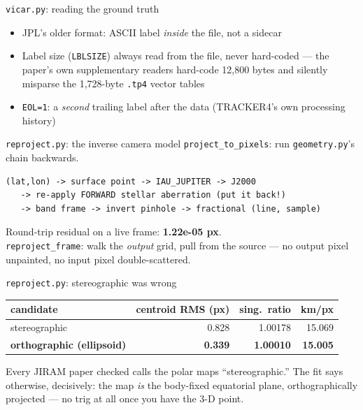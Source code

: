 \documentclass[aspectratio=169,11pt]{beamer}
\newcommand{\currevsec}{}
\newcommand{\revsec}[1]{\gdef\currevsec{#1}}
\begin{document}
\begin{frame}{\texttt{vicar.py}: reading the ground truth}
  \revsec{4.7}
  \begin{itemize}
    \item JPL's older format: ASCII label \emph{inside} the file, not a sidecar
    \item Label size (\texttt{LBLSIZE}) always read from the file, never hard-coded --- the paper's own supplementary readers hard-code 12{,}800 bytes and silently misparse the 1{,}728-byte \texttt{.tp4} vector tables
    \item \texttt{EOL=1}: a \emph{second} trailing label after the data (TRACKER4's own processing history)
  \end{itemize}
\end{frame}

\begin{frame}[fragile]{\texttt{reproject.py}: the inverse camera model}
  \revsec{4.8}
  \texttt{project\_to\_pixels}: run \texttt{geometry.py}'s chain backwards.
\begin{lstlisting}[basicstyle=\ttfamily\tiny,frame=none]
(lat,lon) -> surface point -> IAU_JUPITER -> J2000
   -> re-apply FORWARD stellar aberration (put it back!)
   -> band frame -> invert pinhole -> fractional (line, sample)
\end{lstlisting}
  Round-trip residual on a live frame: \textbf{1.22e-05 px}. \\
  \texttt{reproject\_frame}: walk the \emph{output} grid, pull from the source --- no output pixel unpainted, no input pixel double-scattered.
\end{frame}

\begin{frame}{\texttt{reproject.py}: stereographic was wrong}
  \revsec{4.8}
  \small
  \begin{tabular}{lrrr}
    \toprule
    candidate & centroid RMS (px) & sing.\ ratio & km/px \\
    \midrule
    stereographic & 0.828 & 1.00178 & 15.069 \\
    \textbf{orthographic (ellipsoid)} & \textbf{0.339} & \textbf{1.00010} & \textbf{15.005} \\
    \bottomrule
  \end{tabular}\par
  \vspace{0.3cm}

  Every JIRAM paper checked calls the polar maps ``stereographic.'' The fit says otherwise, decisively: the map \emph{is} the body-fixed equatorial plane, orthographically projected --- no trig at all once you have the 3-D point.
\end{frame}
\end{document}
